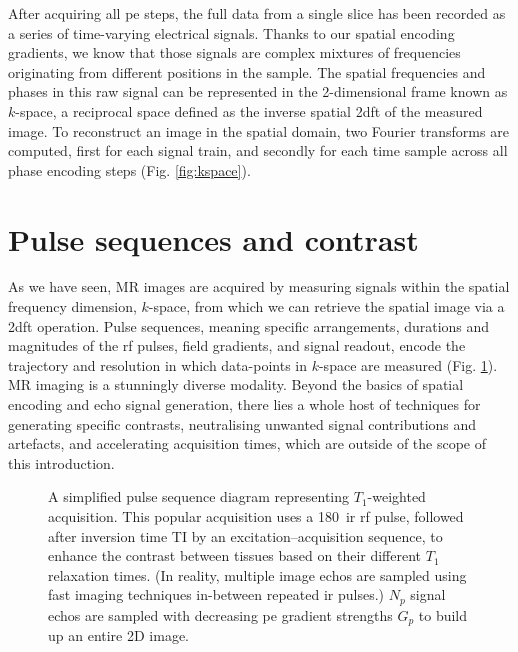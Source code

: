 After acquiring all \gls{pe} steps, the full data from a single slice has been recorded as a series of time-varying electrical signals.
Thanks to our spatial encoding gradients, we know that those signals are complex mixtures of frequencies originating from different positions in the sample.
The spatial frequencies and phases in this raw signal can be represented in the 2-dimensional frame known as $k$-space, a reciprocal space defined as the inverse spatial \gls{2dft} of the measured image.
To reconstruct an image in the spatial domain, two Fourier transforms are computed, first for each signal train, and secondly for each time sample across all phase encoding steps (Fig. \ref{fig:kspace}).

\section{Pulse sequences and contrast}

As we have seen, MR images are acquired by measuring signals within the spatial frequency dimension, $k$-space, from which we can retrieve the spatial image via a \gls{2dft} operation.
Pulse sequences, meaning specific arrangements, durations and magnitudes of the \gls{rf} pulses, field gradients, and signal readout, encode the trajectory and resolution in which data-points in $k$-space are measured (Fig. \ref{fig:mprage}).
MR imaging is a stunningly diverse modality.
Beyond the basics of spatial encoding and echo signal generation, there lies a whole host of techniques for generating specific contrasts, neutralising unwanted signal contributions and artefacts, and accelerating acquisition times, which are outside of the scope of this introduction.

\begin{figure}[htb!]
  
  \caption[MPRAGE pulse sequence diagram]{A simplified pulse sequence diagram representing  $T_1$-weighted acquisition. This popular acquisition uses a 180\textdegree\ \gls{ir} \gls{rf} pulse, followed after inversion time TI by an excitation--acquisition sequence, to enhance the contrast between tissues based on their different $T_1$ relaxation times. (In reality, multiple image echos are sampled using fast imaging techniques in-between repeated \gls{ir} pulses.) $N_p$ signal echos are sampled with decreasing \gls{pe} gradient strengths $G_p$ to build up an entire 2D image.}
  \label{fig:mprage}
\end{figure}

